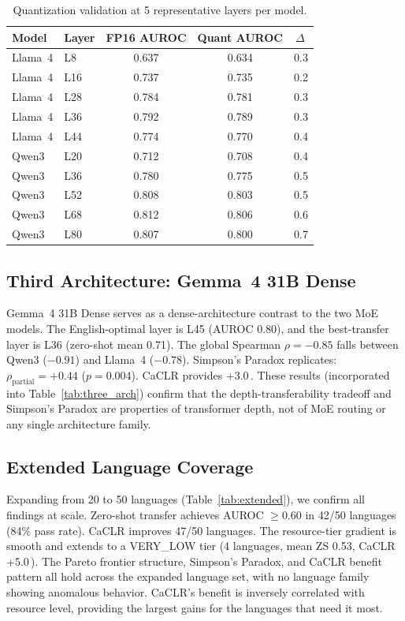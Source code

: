 \documentclass[11pt,a4paper]{article}
\newcommand{\pp}{\,\text{pp}}
\begin{document}
\begin{table}[h]
\centering
\caption{Quantization validation at 5 representative layers per model.}
\label{tab:quant}
\small
\begin{tabular}{llccc}
\toprule
Model & Layer & FP16 AUROC & Quant AUROC & $\Delta$\pp \\
\midrule
Llama~4 & L8  & 0.637 & 0.634 & 0.3 \\
Llama~4 & L16 & 0.737 & 0.735 & 0.2 \\
Llama~4 & L28 & 0.784 & 0.781 & 0.3 \\
Llama~4 & L36 & 0.792 & 0.789 & 0.3 \\
Llama~4 & L44 & 0.774 & 0.770 & 0.4 \\
\midrule
Qwen3 & L20 & 0.712 & 0.708 & 0.4 \\
Qwen3 & L36 & 0.780 & 0.775 & 0.5 \\
Qwen3 & L52 & 0.808 & 0.803 & 0.5 \\
Qwen3 & L68 & 0.812 & 0.806 & 0.6 \\
Qwen3 & L80 & 0.807 & 0.800 & 0.7 \\
\bottomrule
\end{tabular}
\end{table}

\subsection{Third Architecture: Gemma~4 31B Dense}
\label{sec:gemma}

Gemma~4 31B Dense serves as a dense-architecture contrast to the two MoE models. The English-optimal layer is L45 (AUROC 0.80), and the best-transfer layer is L36 (zero-shot mean 0.71). The global Spearman $\rho = -0.85$ falls between Qwen3 ($-0.91$) and Llama~4 ($-0.78$). Simpson's Paradox replicates: $\rho_{\text{partial}} = +0.44$ ($p = 0.004$). CaCLR provides +3.0\pp. These results (incorporated into Table~\ref{tab:three_arch}) confirm that the depth-transferability tradeoff and Simpson's Paradox are properties of transformer depth, not of MoE routing or any single architecture family.

\subsection{Extended Language Coverage}
\label{sec:extended}

Expanding from 20 to 50 languages (Table~\ref{tab:extended}), we confirm all findings at scale. Zero-shot transfer achieves AUROC $\geq 0.60$ in 42/50 languages (84\% pass rate). CaCLR improves 47/50 languages. The resource-tier gradient is smooth and extends to a VERY\_LOW tier (4 languages, mean ZS 0.53, CaCLR +5.0\pp). The Pareto frontier structure, Simpson's Paradox, and CaCLR benefit pattern all hold across the expanded language set, with no language family showing anomalous behavior. CaCLR's benefit is inversely correlated with resource level, providing the largest gains for the languages that need it most.
\end{document}
